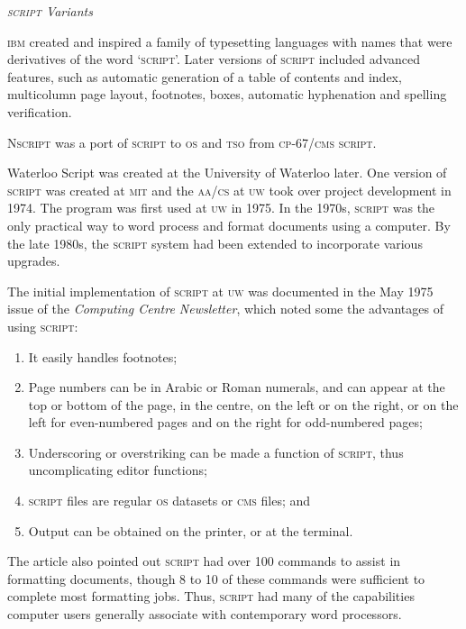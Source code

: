 \documentclass{slipbox}
\makeatletter
\def\subsection#1{\addvspace{\baselineskip}\noindent\textit{#1}\par\addvspace{\baselineskip}\@afterheading\@afterindentfalse}
\makeatother
\begin{document}
\begin{slip}
    \subsection{\textsc{script} Variants}
    \textsc{ibm} created and inspired a family of typesetting languages with names that were derivatives of the word `\textsc{script}'. Later versions of \textsc{script} included advanced features, such as automatic generation of a table of contents and index, multicolumn page layout, footnotes, boxes, automatic hyphenation and spelling verification.

    N\textsc{script} was a port of \textsc{script} to \textsc{os} and \textsc{tso} from \textsc{cp}-67/\textsc{cms} \textsc{script}.

    Waterloo Script was created at the University of Waterloo later. One version of \textsc{script} was created at \textsc{mit} and the \textsc{aa/cs} at \textsc{uw} took over project development in 1974. The program was first used at \textsc{uw} in 1975. In the 1970s, \textsc{script} was the only practical way to word process and format documents using a computer. By the late 1980s, the \textsc{script} system had been extended to incorporate various upgrades.

    The initial implementation of \textsc{script} at \textsc{uw} was documented in the May 1975 issue of the \emph{Computing Centre Newsletter}, which noted some the advantages of using \textsc{script}:
    \begin{enumerate}
      \item It easily handles footnotes;
      \item Page numbers can be in Arabic or Roman numerals, and can appear at the top or bottom of the page, in the centre, on the left or on the right, or on the left for even-numbered pages and on the right for odd-numbered pages;
      \item Underscoring or overstriking can be made a function of \textsc{script}, thus uncomplicating editor functions;
      \item \textsc{script} files are regular \textsc{os} datasets or \textsc{cms} files; and
      \item Output can be obtained on the printer, or at the terminal.
    \end{enumerate}

    The article also pointed out \textsc{script} had over 100 commands to assist in formatting documents, though 8 to 10 of these commands were sufficient to complete most formatting jobs. Thus, \textsc{script} had many of the capabilities computer users generally associate with contemporary word processors.


\end{slip}
\end{document}
